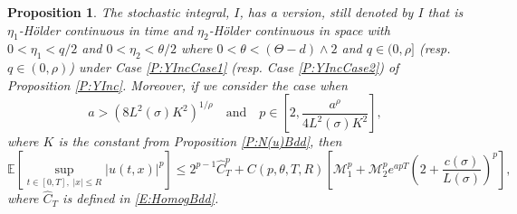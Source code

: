 \documentclass[a4paper,11pt]{article}
\numberwithin{equation}{section}
\theoremstyle{plain}
\newtheorem{proposition}[theorem]{Proposition}
\theoremstyle{definition}
\numberwithin{NQ}{section}
\numberwithin{LQ}{section}
\numberwithin{ZQ}{section}
\begin{document}
	\begin{proposition} \label{P:Holder}
		The stochastic integral, $I$, has a version, still denoted by $I$ that is $\eta_1$-H\"older continuous in time and $\eta_2$-H\"older continuous in space with $0 < \eta_1 < q/2$ and $0 < \eta_2 < \theta/2$ where $0 < \theta < (\Theta -d) \wedge 2$ and $q \in (0, \rho]$ (resp. $q \in (0, \rho)$) under Case \ref{P:YIncCase1} (resp. Case \ref{P:YIncCase2}) of Proposition \ref{P:YInc}. Moreover, if we consider the case when
		\[
		a > \left( 8 L^2(\sigma)K^2\right)^{1/\rho} \quad \text{and} \quad 	p \in \left[ 2, \frac{a^{\rho}}{4L^2(\sigma)K^2} \right],
		\]
		where $K$ is the constant from Proposition \ref{P:N(u)Bdd}, then
		\[
		\mathbb{E}\left[ \sup_{t\in[0,T],\; |x| \le R} |u(t,x)|^p \right] \le 2^{p-1}\widehat{C}_T^p  + C(p, \theta, T,R) \left[ \mathcal{M}_1^p + \mathcal{M}_2^p e^{apT} \left(2 +  \frac{c(\sigma)}{L(\sigma)}\right)^p\right],
		\]
		where $\widehat{C}_T$ is defined in \eqref{E:HomogBdd}.
	\end{proposition}
\end{document}
